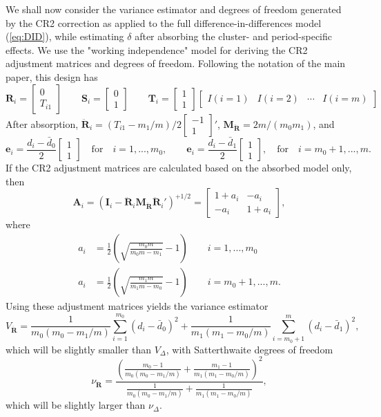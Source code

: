 \documentclass{article}\usepackage[]{graphicx}\usepackage[]{color}
\newcommand{\bm}{\mathbf}
\begin{document}
We shall now consider the variance estimator and degrees of freedom generated by the CR2 correction as applied to the full difference-in-differences model (\ref{eq:DID}), while estimating $\delta$ after absorbing the cluster- and period-specific effects.
We use the "working independence" model for deriving the CR2 adjustment matrices and degrees of freedom.
Following the notation of the main paper, this design has
\[
\bm{R}_i = \left[\begin{array}{c} 0 \\ T_{i1}\end{array}\right] \qquad
\bm{S}_i = \left[\begin{array}{c} 0 \\ 1 \end{array}\right] \qquad
\bm{T}_i = \left[\begin{array}{c} 1 \\ 1 \end{array}\right] \left[\begin{array}{cccc}I(i=1) & I(i=2) & \cdots & I(i=m)\end{array}\right]
\]
After absorption, $\bm{\ddot{R}}_i = \left(T_{i1} - m_1 / m\right) / 2 \left[\begin{array}{c}-1 \\ 1 \end{array}\right]'$, $\bm{M_{\ddot{R}}} = 2 m / (m_0 m_1)$, and 
\[
\bm{e}_i = \frac{d_i - \bar{d}_0}{2} \left[\begin{array}{c} 1 \\ 1 \end{array}\right] \quad \text{for} \quad i = 1,...,m_0, \qquad \bm{e}_i = \frac{d_i - \bar{d}_1}{2} \left[\begin{array}{c} 1 \\ 1 \end{array}\right], \quad \text{for} \quad i = m_0 + 1,...,m.
\]
If the CR2 adjustment matrices are calculated based on the absorbed model only, then 
\[
\bm{A}_i = \left(\bm{I}_i - \bm{\ddot{R}}_i \bm{M_{\ddot{R}}} \bm{\ddot{R}}_i'\right)^{+1/2} = \left[\begin{array}{cc} 1 + a_i & - a_i \\ -a_i & 1 + a_i \end{array}\right],
\]
where
\begin{align*}
a_i &= \frac{1}{2}\left(\sqrt{\frac{m_0 m}{m_0 m - m_1}} - 1\right) \qquad i = 1,...,m_0 \\
a_i &= \frac{1}{2}\left(\sqrt{\frac{m_1 m}{m_1 m - m_0}} - 1\right) \qquad i = m_0 + 1,...,m.
\end{align*}
Using these adjustment matrices yields the variance estimator 
\[
V_{\bm{\ddot{R}}} = \frac{1}{m_0 (m_0 - m_1 / m)} \sum_{i=1}^{m_0} \left(d_i - \bar{d}_0\right)^2 + \frac{1}{m_1 (m_1 - m_0 / m)}\sum_{i=m_0 + 1}^{m} \left(d_i - \bar{d}_1\right)^2,
\]
which will be slightly smaller than $V_\Delta$, with Satterthwaite degrees of freedom
\[
\nu_{\bm{\ddot{R}}} = \frac{\displaystyle{\left(\frac{m_0 - 1}{m_0(m_0 - m_1 / m)} + \frac{m_1 - 1}{m_1(m_1 - m_0 / m)}\right)^2}}{\displaystyle{\frac{1}{m_0(m_0 - m_1 / m)} + \frac{1}{m_1(m_1 - m_0 / m)}}},
\]
which will be slightly larger than $\nu_{\Delta}$.
\end{document}

